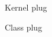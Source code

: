 \documentclass{article}
\begin{document}
\begin{figure}[h]
  \caption{Kernel plug}
\end{figure}
\begin{figure}[h]
  \caption{Class plug}
\end{figure}
\end{document}
